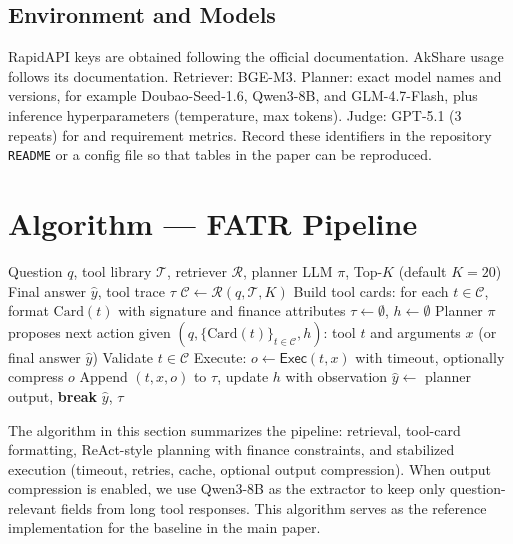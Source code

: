 \subsection{Environment and Models}

RapidAPI keys are obtained following the official documentation. AkShare usage follows its documentation.
Retriever: BGE-M3. Planner: exact model names and versions, for example Doubao-Seed-1.6, Qwen3-8B, and GLM-4.7-Flash, plus inference hyperparameters (temperature, max tokens).
Judge: GPT-5.1 (3 repeats) for \soft{} and requirement metrics. Record these identifiers in the repository \texttt{README} or a config file so that tables in the paper can be reproduced.


\section{Algorithm --- FATR Pipeline}
\label{sec:algorithm}

\begin{algorithm}[H]
\caption{FATR pipeline}
\begin{algorithmic}[1]
\Require Question $q$, tool library $\mathcal{T}$, retriever $\mathcal{R}$, planner LLM $\pi$, Top-$K$ (default $K{=}20$)
\Ensure Final answer $\hat{y}$, tool trace $\tau$
\State $\mathcal{C} \gets \mathcal{R}(q, \mathcal{T}, K)$ 
\State Build tool cards: for each $t \in \mathcal{C}$, format $\mathrm{Card}(t)$ with signature and finance attributes
\State $\tau \gets \emptyset$, $h \gets \emptyset$ 
\Repeat
\State Planner $\pi$ proposes next action given $(q,\{\mathrm{Card}(t)\}_{t\in\mathcal{C}},h)$: tool $t$ and arguments $x$ (or final answer $\hat{y}$)
\State Validate $t \in \mathcal{C}$
\State Execute: $o \gets \mathsf{Exec}(t, x)$ with timeout, optionally compress $o$
\State Append $(t, x, o)$ to $\tau$, update $h$ with observation
\Else
\State $\hat{y} \gets$ planner output, \textbf{break}
\EndIf
{}
\State \Return $\hat{y}$, $\tau$
\end{algorithmic}
\end{algorithm}
\FloatBarrier



The algorithm in this section summarizes the \methodname{} pipeline: retrieval, tool-card formatting, ReAct-style planning with finance constraints, and stabilized execution (timeout, retries, cache, optional output compression).
When output compression is enabled, we use Qwen3-8B as the extractor to keep only question-relevant fields from long tool responses.
This algorithm serves as the reference implementation for the \methodname{} baseline in the main paper.

